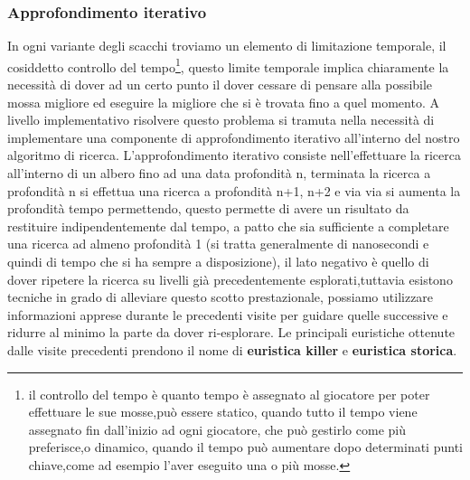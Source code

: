 \subsubsection{Approfondimento iterativo}
In ogni variante degli scacchi troviamo un elemento di limitazione temporale, il cosiddetto controllo del tempo\footnote{il controllo del tempo è quanto tempo è assegnato al giocatore
per poter effettuare le sue mosse,può essere statico, quando tutto il tempo viene assegnato fin dall'inizio ad ogni giocatore, che può gestirlo come più preferisce,o dinamico, 
quando il tempo può aumentare dopo determinati punti chiave,come ad esempio l'aver eseguito una o più mosse.},
questo limite temporale implica chiaramente la necessità di dover ad un certo punto il dover cessare di pensare alla 
possibile mossa migliore ed eseguire la migliore che si è trovata fino a quel momento.
A livello implementativo risolvere questo problema si tramuta nella necessità di implementare una componente di approfondimento
iterativo all'interno del nostro algoritmo di ricerca.
L'approfondimento iterativo consiste nell'effettuare la ricerca all'interno di un albero fino ad una data profondità n,
terminata la ricerca a profondità n si effettua una ricerca a profondità n+1, n+2 e via via si aumenta la profondità tempo permettendo,
questo permette di avere un risultato da restituire indipendentemente dal tempo, a patto che sia sufficiente a completare una 
ricerca ad almeno profondità 1 (si tratta generalmente di nanosecondi e quindi di tempo che si ha sempre a disposizione), il lato negativo
è quello di dover ripetere la ricerca su livelli già precedentemente esplorati,tuttavia esistono tecniche in grado di alleviare questo scotto prestazionale,
possiamo utilizzare informazioni apprese durante le precedenti visite per guidare quelle successive e ridurre al minimo la parte da dover ri-esplorare.
Le principali euristiche ottenute dalle visite precedenti prendono il nome di \textbf{euristica killer} e \textbf{euristica storica}.
